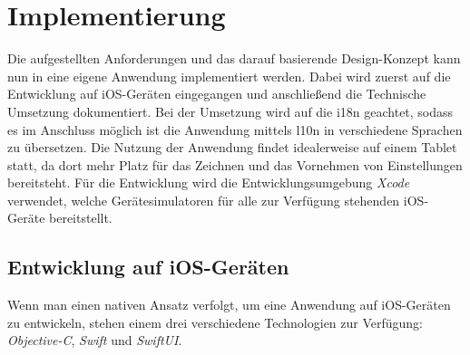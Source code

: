 \chapter{Implementierung}
Die aufgestellten Anforderungen und das darauf basierende Design-Konzept kann nun in eine eigene Anwendung implementiert werden.
Dabei wird zuerst auf die Entwicklung auf iOS-Geräten eingegangen und anschließend die Technische Umsetzung dokumentiert.
Bei der Umsetzung wird auf die \Gls{i18n} geachtet, sodass es im Anschluss möglich ist die Anwendung mittels \Gls{l10n} in verschiedene Sprachen zu übersetzen.\pbreak%
%
Die Nutzung der Anwendung findet idealerweise auf einem Tablet statt, da dort mehr Platz für das Zeichnen und das Vornehmen von Einstellungen bereitsteht.
Für die Entwicklung wird die Entwicklungsumgebung \textit{Xcode} verwendet, welche Gerätesimulatoren für alle zur Verfügung stehenden iOS-Geräte bereitstellt.

\section{Entwicklung auf iOS-Geräten}
Wenn man einen nativen Ansatz verfolgt, um eine Anwendung auf iOS-Geräten zu entwickeln, stehen einem drei verschiedene Technologien zur Verfügung:
\textit{Objective-C}, \textit{Swift} und \textit{SwiftUI}.

